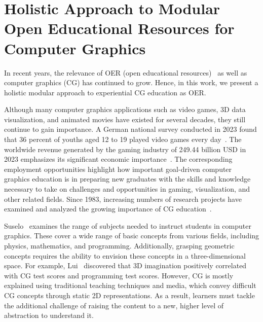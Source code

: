 \chapter{Holistic Approach to Modular Open Educational Resources for Computer Graphics\label{chap:ExGoer}} %
In recent years, the relevance of OER (open educational resources)~\cite{wiley:2014:oer} as well as computer graphics (CG) has continued to grow. Hence, in this work, we present a holistic modular approach to experiential CG education as OER.

Although many computer graphics applications such as video games, 3D data visualization, and animated movies have existed for several decades, they still continue to gain importance. A German national survey conducted in 2023 found that 36 percent of youths aged 12 to 19 played video games every day~\cite{jim:2023:studies}. 
The worldwide revenue generated by the gaming industry of 249.44 billion USD in 2023 emphasizes its significant economic importance~\cite{Statista-Market-Insights:2023:Videogames-worldwide}. The corresponding employment opportunities highlight how important goal-driven computer graphics education is in preparing new graduates with the skills and knowledge necessary to take on challenges and opportunities in gaming, visualization, and other related fields. Since 1983, increasing numbers of research projects have examined and analyzed the growing importance of CG education~\cite{Balreira:2017:topics-cg-teaching}.

Suselo~\cite{Suselo:2019:problems-cg-teaching} examines the range of subjects needed to instruct students in computer graphics. These cover a wide range of basic concepts from various fields, including physics, mathematics, and programming. Additionally, grasping geometric concepts requires the ability to envision these concepts in a three-dimensional space. For example, Lui~\cite{Lui:2022:problems-cg-teaching} discovered that 3D imagination positively correlated with CG test scores and programming test scores. However, CG is mostly explained using traditional teaching techniques and media, which convey difficult CG concepts through static 2D representations. As a result, learners must tackle the additional challenge of raising the content to a new, higher level of abstraction to understand it.

